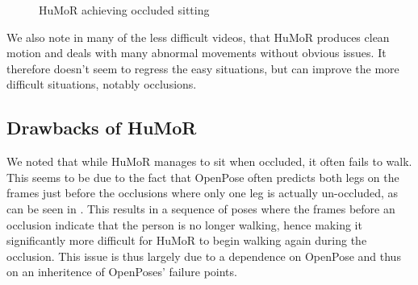 \begin{figure}[!ht]
    \centering
    \hfil
    \hfil
    \caption{HuMoR achieving occluded sitting}
    \label{fig:humor_sitting}
\end{figure}

We also note in many of the less difficult videos, that HuMoR produces clean motion and deals with many abnormal movements without obvious issues. It therefore doesn't seem to regress the easy situations, but can improve the more difficult situations, notably occlusions.


\subsection{Drawbacks of HuMoR}

We noted that while HuMoR manages to sit when occluded, it often fails to walk. This seems to be due to the fact that OpenPose often predicts both legs on the frames just before the occlusions where only one leg is actually un-occluded, as can be seen in . This results in a sequence of poses where the frames before an occlusion indicate that the person is no longer walking, hence making it significantly more difficult for HuMoR to begin walking again during the occlusion. This issue is thus largely due to a dependence on OpenPose and thus on an inheritence of OpenPoses' failure points.

